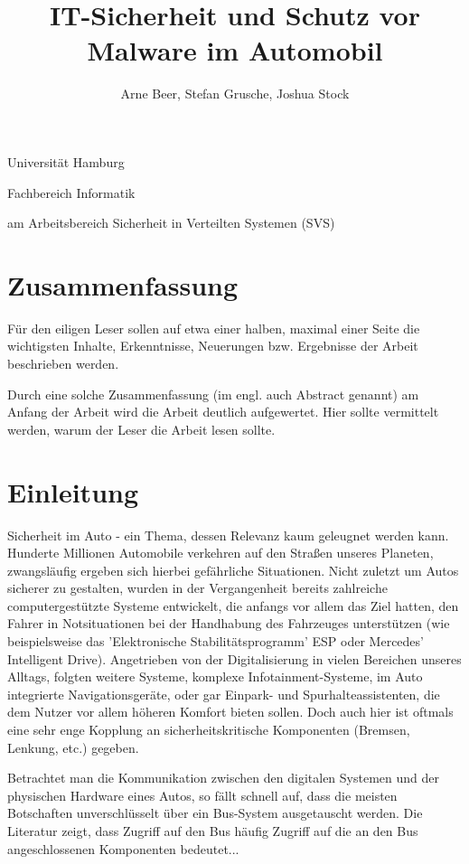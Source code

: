 \documentclass[
    fontsize=12pt,
    headings=small,
    parskip=half,           %
    bibliography=totoc,9
    numbers=noenddot,       %
    open=any,               %
    ]{scrreprt}
\title{IT-Sicherheit und Schutz vor Malware im Automobil}
\author{Arne Beer, Stefan Grusche, Joshua Stock}
\begin{document}
\begin{titlepage}
\begin{center}\Large
    Universität Hamburg \par
    Fachbereich Informatik
    \vfill
    \makeatletter
    {\Large\textsf{\textbf{\@title}}\par}
    \makeatother
    \bigskip
    am Arbeitsbereich Sicherheit in Verteilten Systemen (SVS) \par
    \bigskip
    \makeatletter
    {\@author} \par
    \makeatother
    \bigskip
    \makeatletter
    {\@date}
    \makeatother
    \vfill
    \vfill
\end{center}
\end{titlepage}




\chapter*{Zusammenfassung}

Für den eiligen Leser sollen auf etwa einer halben, maximal einer Seite die wichtigsten Inhalte, Erkenntnisse, Neuerungen bzw. Ergebnisse der Arbeit beschrieben werden.

Durch eine solche Zusammenfassung (im engl. auch Abstract genannt) am Anfang der Arbeit wird die Arbeit deutlich aufgewertet. Hier sollte vermittelt werden, warum der Leser die Arbeit lesen sollte.

\tableofcontents

\chapter{Einleitung}
Sicherheit im Auto - ein Thema, dessen Relevanz kaum geleugnet werden kann. Hunderte Millionen Automobile verkehren auf den Straßen unseres Planeten, zwangsläufig ergeben sich hierbei gefährliche Situationen. Nicht zuletzt um Autos sicherer zu gestalten, wurden in der Vergangenheit bereits zahlreiche computergestützte Systeme entwickelt, die anfangs vor allem das Ziel hatten, den Fahrer in Notsituationen bei der Handhabung des Fahrzeuges unterstützen (wie beispielsweise das 'Elektronische Stabilitätsprogramm' ESP oder Mercedes' Intelligent Drive). Angetrieben von der Digitalisierung in vielen Bereichen unseres Alltags, folgten weitere Systeme, komplexe Infotainment-Systeme, im Auto integrierte Navigationsgeräte, oder gar Einpark- und Spurhalteassistenten, die dem Nutzer vor allem höheren Komfort bieten sollen. Doch auch hier ist oftmals eine sehr enge Kopplung an sicherheitskritische Komponenten (Bremsen, Lenkung, etc.) gegeben.\par
Betrachtet man die Kommunikation zwischen den digitalen Systemen und der physischen Hardware eines Autos, so fällt schnell auf, dass die meisten Botschaften unverschlüsselt über ein Bus-System ausgetauscht werden. Die Literatur zeigt, dass Zugriff auf den Bus häufig Zugriff auf die an den Bus angeschlossenen Komponenten bedeutet... %
\end{document}

